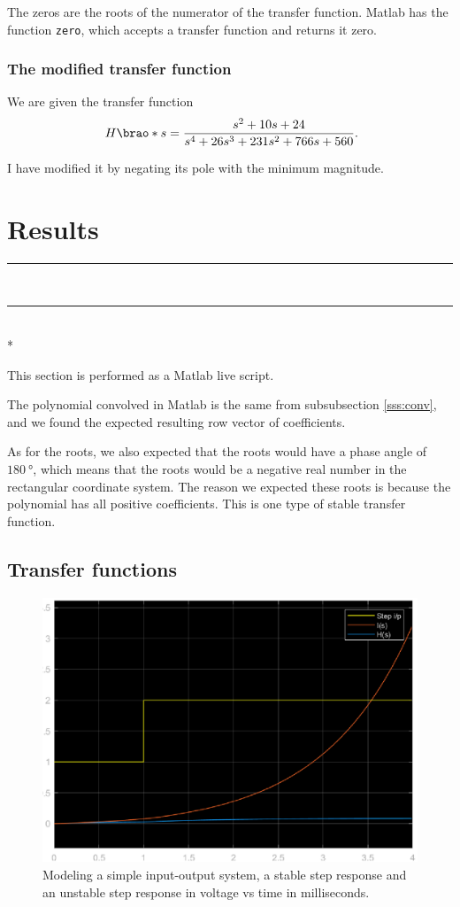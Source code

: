 \documentclass[12pt]{article}
\DeclarePairedDelimiter\brao()%
\def\hr{{\par\noindent\rule{\textwidth}{0.4pt}}}
\begin{document}
The zeros are the roots of the numerator of the transfer function.
Matlab has the function \texttt{zero},
which accepts a transfer function and returns it zero.

\subsubsection{The modified transfer function}

We are given the transfer function
\[
    H\brao*s = \frac{s^2 + 10s + 24}{s^4 + 26s^3 + 231s^2 + 766s + 560}\rlap.
\]

I have modified it by negating its pole with the minimum magnitude.

\section{Results}

\hr

%

\ \hr \\*

This section is performed as a Matlab live script.

The polynomial convolved in Matlab is the same from subsubsection \ref{sss:conv}, and we found the expected resulting row vector of coefficients.

As for the roots, we also expected that the roots would have a phase angle of $\SI{180}\degree$,
which means that the roots would be a negative real number in the rectangular coordinate system.
The reason we expected these roots is because the polynomial has all positive coefficients.
This is one type of stable transfer function.

\subsection{Transfer functions}

\begin{figure}
    \centering
    \includegraphics[width=\linewidth]{transfer_functions.eps}
    \caption{Modeling a simple input-output system, a stable step response and an unstable step response in voltage vs time in milliseconds.}
    \label{fig:transfer functions}
\end{figure}
\end{document}

